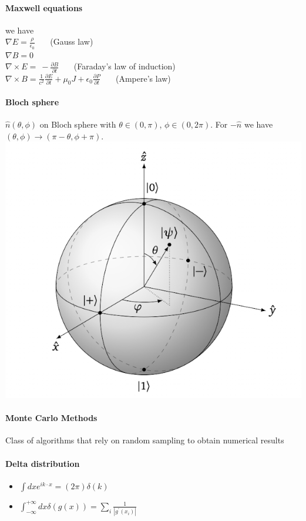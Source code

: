 \paragraph{Maxwell equations} we have \\
$ \nabla E = \frac{\rho}{\epsilon_0}  \quad  $  \ (Gauss law)   \\
$ \nabla B = 0 $ \\
$ \nabla \times E = \ - \frac{\partial B}{\partial t} \quad  $ \  (Faraday's law of induction) \\
$ \nabla \times B = \frac{1}{c^2} \frac{ \partial E}{\partial t} + \mu_0 J + \epsilon_0 \frac{\partial P} {\partial t} \quad $ \ (Ampere's law)


\paragraph{Bloch sphere}$\hat{n}(\theta, \phi)$ on Bloch sphere with $\theta \in (0, \pi)$, $\phi \in (0,2 \pi)$. 
For $- \hat{n}$ we have $(\theta, \phi) \to (\pi - \theta , \phi + \pi) $.\\
\includegraphics[scale=0.2]{fig/BlochSph.png}

\paragraph{Monte Carlo Methods} Class of algorithms that rely on random sampling to obtain numerical results

\paragraph{Delta distribution}
\begin{itemize}
  \item $\int d x e^{i k \cdot x}=(2 \pi) \delta(k)$
  \item $\int_{-\infty}^{+\infty} d x \delta(g(x))=\sum_i \frac{1}{\left|g^{\prime}\left(x_i\right)\right|} $
\end{itemize}

